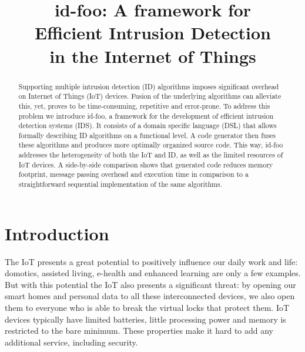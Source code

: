 \documentclass[conference]{IEEEtran}
\newcommand{\NAME}{id-foo\xspace}
\begin{document}
\expandafter\def\csname PY@tok@err\endcsname{}

\title{
\NAME: A framework for \\
Efficient Intrusion Detection\\
in the Internet of Things
}

\author{%
}

\maketitle

\begin{abstract}

Supporting multiple intrusion detection (ID) algorithms imposes significant
overhead on Internet of Things (IoT) devices. Fusion of the underlying
algorithms can alleviate this, yet, proves to be time-consuming, repetitive and
error-prone. To address this problem we introduce \NAME, a framework for the
development of efficient intrusion detection systems (IDS). It consists of a
domain specific language (DSL) that allows formally describing ID algorithms on
a functional level. A code generator then fuses these algorithms and produces
more optimally organized source code. This way, \NAME addresses the
heterogeneity of both the IoT and ID, as well as the limited resources of IoT
devices. A side-by-side comparison shows that generated code reduces memory
footprint, message passing overhead and execution time in comparison to a
straightforward sequential implementation of the same algorithms.

\end{abstract}

\section{Introduction}



The IoT presents a great potential to positively influence our daily work and
life: domotics, assisted living, e-health and enhanced learning are only a few
examples\cite{atzori2010internet}. But with this potential the IoT also
presents a significant threat: by opening our smart homes
\cite{aldrich2003smart} and personal data\cite{weber2010internet} to all these
interconnected devices, we also open them to everyone who is able to break the
virtual locks that protect them. IoT devices typically have limited batteries,
little processing power and memory is restricted to the bare minimum. These
properties make it hard to add any additional service, including security.
\end{document}
